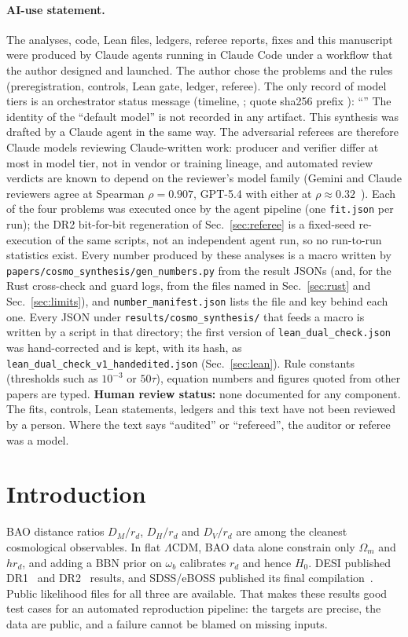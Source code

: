 \documentclass[11pt]{article}
\begin{document}
\paragraph{AI-use statement.}
The analyses, code, Lean files, ledgers, referee reports, fixes and this manuscript were produced by Claude agents running in Claude
Code under a workflow that the author designed and launched. The author chose the problems and the rules (preregistration, controls,
Lean gate, ledger, referee). The only record of model tiers is an orchestrator status message (timeline, \tierTime; quote
sha256 prefix \texttt{\tierShaShort}): ``\tierQuote'' The identity of the ``default model'' is not recorded in any artifact.
This synthesis was drafted by a Claude agent in the same way. The adversarial referees are therefore Claude models reviewing Claude-written work:
producer and verifier differ at most in model tier, not in vendor or training lineage, and automated review verdicts are known to depend on the
reviewer's model family (Gemini and Claude reviewers agree at Spearman $\rho=0.907$, GPT-5.4 with either at $\rho\approx0.32$~\cite{ravideshik2026}).
Each of the four problems was executed once by the agent pipeline (one \texttt{fit.json} per run); the DR2 bit-for-bit regeneration of
Sec.~\ref{sec:referee} is a fixed-seed re-execution of the same scripts, not an independent agent run, so no run-to-run statistics exist. Every number produced by these analyses is a macro written by
\texttt{papers/cosmo\_synthesis/gen\_numbers.py} from the result JSONs (and, for the Rust cross-check and guard logs, from the
files named in Sec.~\ref{sec:rust} and Sec.~\ref{sec:limits}), and \texttt{number\_manifest.json} lists the file and key behind each one.
Every JSON under \texttt{results/cosmo\_synthesis/} that feeds a macro is written by a script in that directory; the first version of
\texttt{lean\_dual\_check.json} was hand-corrected and is kept, with its hash, as \texttt{lean\_dual\_check\_v1\_handedited.json} (Sec.~\ref{sec:lean}).
Rule constants (thresholds such as $10^{-3}$ or $50\tau$), equation numbers and figures quoted from other papers are typed.
\textbf{Human review status:} none documented for any component. The fits, controls, Lean statements, ledgers and this text have not
been reviewed by a person. Where the text says ``audited'' or ``refereed'', the auditor or referee was a model.

\section{Introduction}
BAO distance ratios $D_M/r_d$, $D_H/r_d$ and $D_V/r_d$ are among the cleanest cosmological observables. In flat $\Lambda$CDM, BAO data alone
constrain only $\Omega_m$ and $h r_d$, and adding a BBN prior on $\omega_b$ calibrates $r_d$ and hence $H_0$. DESI published
DR1~\cite{desi2024vi} and DR2~\cite{desi2025dr2} results, and SDSS/eBOSS published its final compilation~\cite{eboss2021}. Public
likelihood files for all three are available. That makes these results good test cases for an automated reproduction pipeline:
the targets are precise, the data are public, and a failure cannot be blamed on missing inputs.
\end{document}
